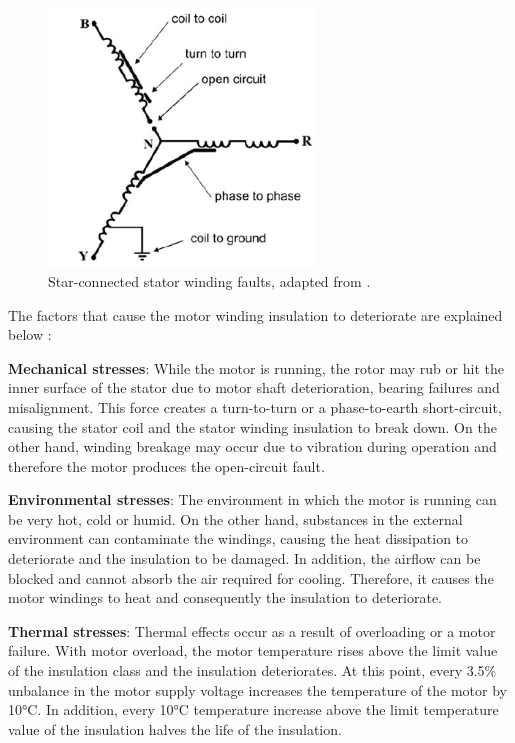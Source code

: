 \begin{figure}[h]
	\centering
	\includegraphics[width=200pt,keepaspectratio=true]{./fig/stator.PNG}
	\caption{Star-connected stator winding faults, adapted from \cite{karmakar2016induction}.}	
	\label{statorwinding}
\end{figure}

The factors that cause the motor winding insulation to deteriorate are explained below \cite{bonnett1999root,karmakar2016induction,Siddique,faiz2017fault}:

\textbf{Mechanical stresses}: While the motor is running, the rotor may rub or hit the inner surface of the stator due to motor shaft deterioration, bearing failures and misalignment. This force creates a turn-to-turn or a phase-to-earth short-circuit, causing the stator coil and the stator winding insulation to break down. On the other hand, winding breakage may occur due to vibration during operation and therefore the motor produces the open-circuit fault.

\textbf{Environmental stresses}: The environment in which the motor is running can be very hot, cold or humid. On the other hand, substances in the external environment can contaminate the windings, causing the heat dissipation to deteriorate and the insulation to be damaged. In addition, the airflow can be blocked and cannot absorb the air required for cooling. Therefore, it causes the motor windings to heat and consequently the insulation to deteriorate.

\textbf{Thermal stresses}: Thermal effects occur as a result of overloading or a motor failure. With motor overload, the motor temperature rises above the limit value of the insulation class and the insulation deteriorates. At this point, every 3.5\% unbalance in the motor supply voltage increases the temperature of the motor by 10°C. In addition, every 10°C temperature increase above the limit temperature value of the insulation halves the life of the insulation.

